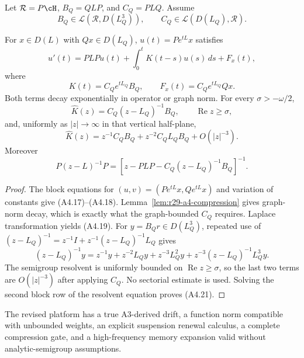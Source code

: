 Let $\mathcal R=P\cH$, $B_Q=QLP$, and $C_Q=PLQ$.  Assume
\[
 B_Q\in\mathcal L(\mathcal R,D(L_Q^3)),\qquad
 C_Q\in\mathcal L(D(L_Q),\mathcal R).                    \tag{A4.16}
\]

\begin{theorem}
\label{thm:r29-a4-memory}
For $x\in D(L)$ with $Qx\in D(L_Q)$, $u(t)=Pe^{tL}x$ satisfies
\[
 u'(t)=PLPu(t)+\int_0^tK(t-s)u(s)\,ds+F_x(t),             \tag{A4.17}
\]
where
\[
 K(t)=C_Qe^{tL_Q}B_Q,
 \qquad F_x(t)=C_Qe^{tL_Q}Qx.                             \tag{A4.18}
\]
Both terms decay exponentially in operator or graph norm.  For every
$\sigma> -\omega/2$,
\[
 \widehat K(z)=C_Q(z-L_Q)^{-1}B_Q,
 \qquad \operatorname{Re}z\ge\sigma,                     \tag{A4.19}
\]
and, uniformly as $|z|\to\infty$ in that vertical half-plane,
\[
 \widehat K(z)=z^{-1}C_QB_Q+z^{-2}C_QL_QB_Q+O(|z|^{-3}).  \tag{A4.20}
\]
Moreover
\[
 P(z-L)^{-1}P=
 [z-PLP-C_Q(z-L_Q)^{-1}B_Q]^{-1}.                         \tag{A4.21}
\]
\end{theorem}

\begin{proof}
The block equations for $(u,v)=(Pe^{tL}x,Qe^{tL}x)$ and variation of constants
give (A4.17)--(A4.18).  Lemma~\ref{lem:r29-a4-compression} gives graph-norm
decay, which is exactly what the graph-bounded $C_Q$ requires.  Laplace
transformation yields (A4.19).  For $y=B_Qr\in D(L_Q^3)$, repeated use of
$(z-L_Q)^{-1}=z^{-1}I+z^{-1}(z-L_Q)^{-1}L_Q$ gives
\[
 (z-L_Q)^{-1}y=z^{-1}y+z^{-2}L_Qy
 +z^{-3}L_Q^2y+z^{-3}(z-L_Q)^{-1}L_Q^3y.
\]
The semigroup resolvent is uniformly bounded on
$\operatorname{Re}z\ge\sigma$, so the last two terms are $O(|z|^{-3})$ after
applying $C_Q$.  No sectorial estimate is used.  Solving the second block row
of the resolvent equation proves (A4.21).
\end{proof}

The revised platform has a true A3-derived drift, a function norm compatible
with unbounded weights, an explicit suspension renewal calculus, a complete
compression gate, and a high-frequency memory expansion valid without
analytic-semigroup assumptions.
